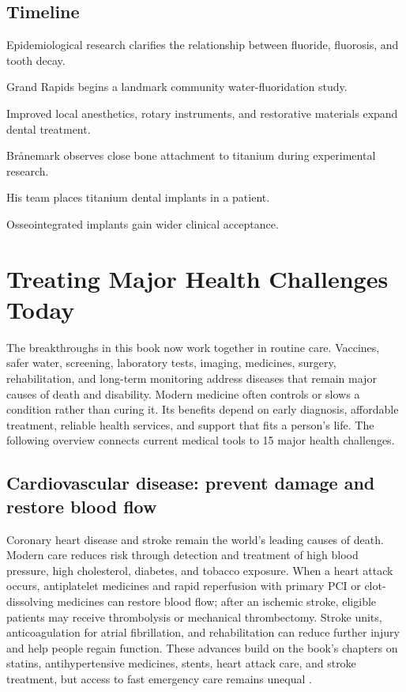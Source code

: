 \documentclass[12pt,oneside]{book}
\begin{document}
\section*{Timeline}
\begin{description}[leftmargin=2.3cm,style=nextline]
  \item[1930s--1940s] Epidemiological research clarifies the relationship between fluoride, fluorosis, and tooth decay.
  \item[1945] Grand Rapids begins a landmark community water-fluoridation study.
  \item[Mid-twentieth century] Improved local anesthetics, rotary instruments, and restorative materials expand dental treatment.
  \item[1952] Br\aa nemark observes close bone attachment to titanium during experimental research.
  \item[1965] His team places titanium dental implants in a patient.
  \item[1980s onward] Osseointegrated implants gain wider clinical acceptance.
\end{description}

\chapter[Treating Major Health Challenges Today]{Treating Major Health Challenges Today}

The breakthroughs in this book now work together in routine care. Vaccines,
safer water, screening, laboratory tests, imaging, medicines, surgery,
rehabilitation, and long-term monitoring address diseases that remain major
causes of death and disability. Modern medicine often controls or slows a
condition rather than curing it. Its benefits depend on early diagnosis,
affordable treatment, reliable health services, and support that fits a
person's life. The following overview connects current medical tools to 15
major health challenges.

\section{Cardiovascular disease: prevent damage and restore blood flow}
Coronary heart disease and stroke remain the world's leading causes of death.
Modern care reduces risk through detection and treatment of high blood
pressure, high cholesterol, diabetes, and tobacco exposure. When a heart
attack occurs, antiplatelet medicines and rapid reperfusion with primary PCI
or clot-dissolving medicines can restore blood flow; after an ischemic stroke,
eligible patients may receive thrombolysis or mechanical thrombectomy.
Stroke units, anticoagulation for atrial fibrillation, and rehabilitation can
reduce further injury and help people regain function. These advances build
on the book's chapters on statins, antihypertensive medicines, stents, heart
attack care, and stroke treatment, but access to fast emergency care remains
unequal \cite{whoCVD2025,whoStroke2025}.
\end{document}
